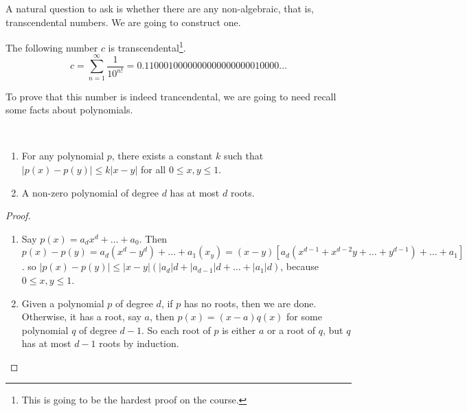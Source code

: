 \documentclass[a4paper]{scrreprt}
\begin{document}
A natural question to ask is whether there are any non-algebraic, that is, transcendental numbers.
We are going to construct one.

\begin{theorem}\label{thm:c-trancendental}
	The following number $c$ is transcendental\footnote{This is going to be the hardest proof on the course.}.
	$$
	c = \sum_{n = 1}^\infty \frac{1}{10^{n!}} = 0.1100010000000000000000010000\dots
	$$
\end{theorem}

To prove that this number is indeed trancendental, we are going to need recall some facts about polynomials.

\begin{proposition}~
	\vspace*{-1.5\baselineskip}
\begin{enumerate}[label=(\roman*)]
	\item For any polynomial $p$, there exists a constant $k$ such that $|p(x) - p(y)| \leq k|x - y|$ for all $0 \leq x, y \leq 1$.
	\item A non-zero polynomial of degree $d$ has at most $d$ roots.
\end{enumerate}
\end{proposition}
\begin{proof}$ $
	\begin{enumerate}[label=(\roman*)]
		\item Say $p(x) = a_d x^d + \dots + a_0$. Then $p(x) - p(y) = a_d(x^d - y^d) + \dots + a_1(x _ y) = (x - y)\left[a_d(x^{d - 1} + x^{d - 2}y + \dots + y^{d - 1}) + \dots + a_1\right]$.
		 so $|p(x) - p(y)| \leq |x - y| \left(|a_d|d + |a_{d - 1}|d + \dots + |a_1|d\right)$, because $0 \leq x, y \leq 1$.
		\item Given a polynomial $p$ of degree $d$, if $p$ has no roots, then we are done. Otherwise, it has a root, say $a$, then $p(x) = (x - a)q(x)$ for some polynomial $q$ of degree $d - 1$. So each root of $p$ is either $a$ or a root of $q$, but $q$ has at most $d - 1$ roots by induction. 
	\end{enumerate}
\end{proof}
\end{document}
